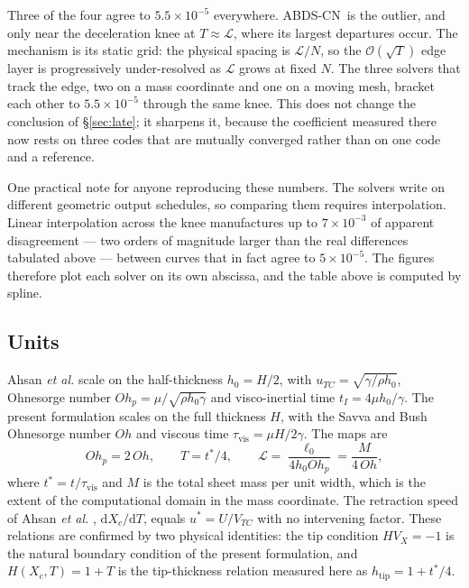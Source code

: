 \documentclass[11pt,a4paper]{article}
\newcommand{\AB}{\textsf{ABDS-CN}}
\newcommand{\Xc}{X_{c}}
\begin{document}
Three of the four agree to $5.5\times10^{-5}$ everywhere. \AB\ is the outlier,
and only near the deceleration knee at $T \approx \mathcal{L}$, where its
largest departures occur. The mechanism is its static grid: the physical
spacing is $\mathcal{L}/N$, so the $\mathcal{O}(\sqrt{T})$ edge layer is
progressively under-resolved as $\mathcal{L}$ grows at fixed $N$. The three
solvers that track the edge, two on a mass coordinate and one on a moving
mesh, bracket each other to $5.5\times10^{-5}$ through the same knee. This does
not change the conclusion of \S\ref{sec:late}; it sharpens it, because the
coefficient measured there now rests on three codes that are mutually converged
rather than on one code and a reference.

One practical note for anyone reproducing these numbers. The solvers write on
different geometric output schedules, so comparing them requires interpolation.
Linear interpolation across the knee manufactures up to $7\times10^{-3}$ of
apparent disagreement --- two orders of magnitude larger than the real
differences tabulated above --- between curves that in fact agree to
$5\times10^{-5}$. The figures therefore plot each solver on its own abscissa,
and the table above is computed by spline.

\subsection{Units}
\label{sec:units}

Ahsan \textit{et al.} \cite{ahsan2025} scale on the half-thickness $h_0 = H/2$, with
$u_{TC} = \sqrt{\gamma/\rho h_0}$, Ohnesorge number
$Oh_{p} = \mu/\sqrt{\rho h_0 \gamma}$ and visco-inertial time
$t_I = 4\mu h_0/\gamma$. The present formulation scales on the full thickness $H$, with the
Savva and Bush \cite{savva2009} Ohnesorge number $Oh$ and viscous time
$\tau_{\mathrm{vis}} = \mu H/2\gamma$. The maps are
%
\begin{equation}
  Oh_{p} = 2\,Oh, \qquad T = t^{*}/4, \qquad
  \mathcal{L} = \frac{\ell_0}{4 h_0 Oh_{p}} = \frac{M}{4\,Oh},
  \label{eq:units}
\end{equation}
%
where $t^{*} = t/\tau_{\mathrm{vis}}$ and $M$ is the total sheet mass per unit
width, which is the extent of the computational domain in the mass coordinate.
The retraction speed of Ahsan \textit{et al.} \cite{ahsan2025}, $\mathrm{d}\Xc/\mathrm{d}T$, equals $u^{*} = U/V_{TC}$
with no intervening factor. These relations are confirmed by two physical identities: the tip condition
$H V_X = -1$ is the natural boundary condition of the present formulation, and
$H(\Xc,T) = 1+T$ is the tip-thickness relation measured here as
$h_{\mathrm{tip}} = 1 + t^{*}/4$.
\end{document}
